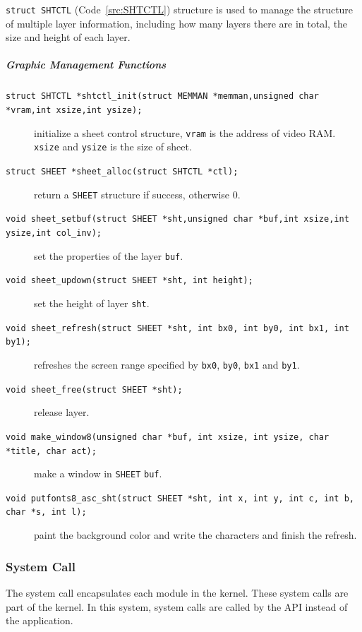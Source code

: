 \documentclass{swfcthesis}
\begin{document}
\texttt{struct SHTCTL} (Code~\ref{src:SHTCTL}) structure is used to manage the structure
of multiple layer information, including how many layers there are in total, the size and
height of each layer.


\subparagraph{Graphic Management Functions}

\begin{description}
  
\item[\texttt{struct SHTCTL *shtctl_init(struct MEMMAN *memman,unsigned char
    *vram,int xsize,int ysize);}] initialize a sheet control structure, \texttt{vram} is
  the address of video RAM. \texttt{xsize} and \texttt{ysize} is the size of sheet.
  
\item[\texttt{struct SHEET *sheet_alloc(struct SHTCTL *ctl);}] return a
  \texttt{SHEET} structure if success, otherwise 0.

\item[\texttt{void sheet_setbuf(struct SHEET *sht,unsigned char *buf,int xsize,int
    ysize,int col_inv);}] set the properties of the layer \texttt{buf}.

\item[\texttt{void sheet_updown(struct SHEET *sht, int height);}] set the height of
  layer \texttt{sht}.

\item[\texttt{void sheet_refresh(struct SHEET *sht, int bx0, int by0, int bx1, int
    by1);}] refreshes the screen range specified by \texttt{bx0}, \texttt{by0},
  \texttt{bx1} and \texttt{by1}.

\item[\texttt{void sheet_free(struct SHEET *sht);}] release layer.

\item[\texttt{void make_window8(unsigned char *buf, int xsize, int ysize, char
    *title, char act);}] make a window in \texttt{SHEET} \texttt{buf}.

\item[\texttt{void putfonts8_asc_sht(struct SHEET *sht, int x, int y, int c, int b,
    char *s, int l);}] paint the background color and write the characters and finish the
  refresh.
    
\end{description}




\subsubsection{System Call}
\label{sec:system-call}
The system call encapsulates each module in the kernel. These system calls are part of the
kernel. In this system, system calls are called by the API instead of the application.
\end{document}
